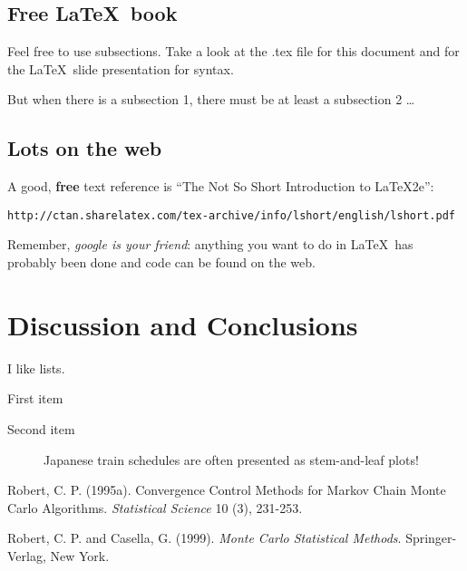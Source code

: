 \documentclass[11pt]{article}
\begin{document}
\subsection{Free \LaTeX\ book}

Feel free to use subsections.  Take a look at the .tex file for this document and for the \LaTeX\ slide presentation for syntax.


But when there is a subsection 1, there must be at least a subsection 2 \ldots

\subsection{Lots on the web}

\vspace{0.2cm}
\noindent A good, {\bf free} text reference is 
``The Not So Short Introduction to \LaTeX2e'':

{\tt http://ctan.sharelatex.com/tex-archive/info/lshort/english/lshort.pdf}

\noindent Remember, {\em google is your friend}: anything you want to do in \LaTeX\ has probably been done and code can be found on the web.  

\section{Discussion and Conclusions}
\label{disc}

I like lists.
\begin{list}{.}{\setlength{\rightmargin}{\leftmargin}}
\item First item
\item Second item
\end{list}


\begin{figure}[h!]
\begin{center}
\end{center}
\caption{Japanese train schedules are often presented as stem-and-leaf plots!}
\label{JRsched}
\end{figure}


\clearpage
\begin{thebibliography}{99}

Robert, C. P.  (1995a).  Convergence Control Methods for Markov Chain
Monte Carlo Algorithms.  {\em Statistical Science} 10 (3), 231-253.

Robert, C. P. and Casella, G.  (1999).  {\em Monte Carlo Statistical
Methods}.  Springer-Verlag, New York.

\end{thebibliography}
\end{document}
